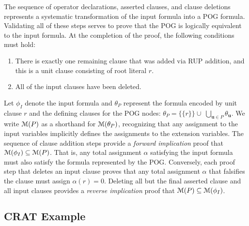 \documentclass[letterpaper,USenglish,cleveref, autoref, thm-restate]{lipics-v2021}
\newcommand{\assign}{\alpha}
\newcommand{\modelset}{{\cal M}}
\newcommand{\inputformula}{\phi_I}
\newcommand{\pogformula}{\theta_P}
\newcommand{\makenode}[1]{\mathbf{#1}}
\newcommand{\nodeu}{\makenode{u}}
\begin{document}

The sequence of operator declarations, asserted clauses, and
clause deletions represents a systematic transformation of the input formula
into a POG formula.  Validating all of these steps serves to prove that the
POG is logically equivalent to the input formula.
At the completion of the proof, the following conditions must hold:
\begin{enumerate}
\item There is exactly one remaining clause that was added via RUP
  addition, and this is a unit clause consisting of root literal $r$.
\item All of the input clauses have been deleted.
\end{enumerate}
Let $\inputformula$ denote the input formula and $\pogformula$ represent the formula encoded by unit clause $r$ and the defining clauses for the POG nodes:
$\pogformula = \{\{r\}\} \cup \; \bigcup_{\nodeu \in P} \theta_{\nodeu}$.  We write $\modelset(P)$ as a shorthand for $\modelset(\pogformula)$, recognizing that
any assignment to the input variables implicitly defines the assignments to the extension variables.
The sequence of clause addition steps provide a {\em forward implication} proof that
$\modelset(\inputformula) \subseteq \modelset(P)$.  That is, any total
assignment $\assign$ satisfying the input formula must also satisfy
the formula represented by the POG\@.
Conversely,
each proof step that deletes an input clause proves that any
total assignment $\alpha$ that falsifies the clause must
assign $\assign(r) = 0$.  Deleting all but the final asserted clause and all input clauses provides a {\em reverse implication} proof
that
$\modelset(P) \subseteq \modelset(\inputformula)$.

\subsection{CRAT Example}
\end{document}
